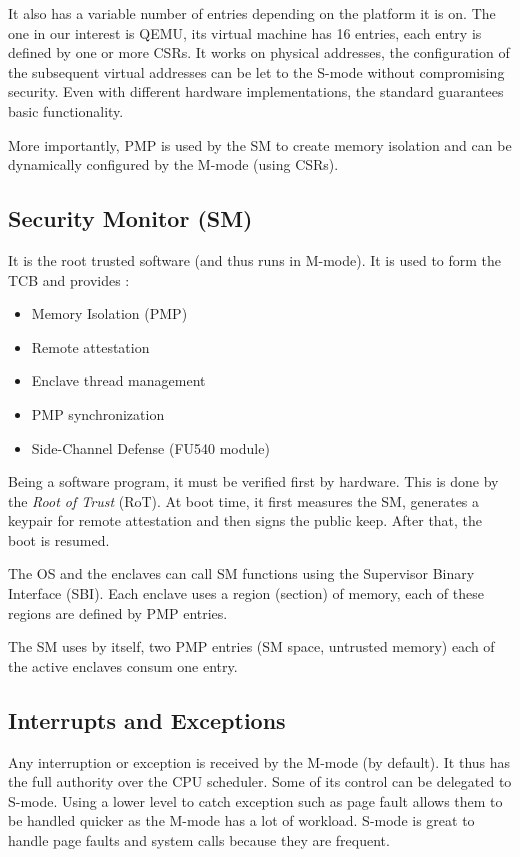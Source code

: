 \documentclass[11pt,a4paper]{report}
\begin{document}
It also has a variable number of entries depending on the platform it is on. 
The one in our interest is QEMU, its virtual machine has 16 entries, each entry is defined by one or more CSRs.
It works on physical addresses, the configuration of the subsequent virtual addresses can be let to the S-mode without compromising security.
Even with different hardware implementations, the standard guarantees basic functionality. 

More importantly, PMP is used by the SM to create memory isolation and can be dynamically configured by the M-mode (using CSRs).

\subsection{Security Monitor (SM)}
\label{sub:sm}
It is the root trusted software (and thus runs in M-mode). 
It is used to form the TCB and provides :
\begin{itemize}
    \item Memory Isolation (PMP)
    \item Remote attestation
    \item Enclave thread management
    \item PMP synchronization
    \item Side-Channel Defense (FU540 module)
\end{itemize}   
Being a software program, it must be verified first by hardware. 
This is done by the \textit{Root of Trust} (RoT). 
At boot time, it first measures the SM, generates a keypair for remote attestation and then signs the public keep.
After that, the boot is resumed.

The OS and the enclaves can call SM functions using the Supervisor Binary Interface (SBI).
Each enclave uses a region (section) of memory, each of these regions are defined by PMP entries.

The SM uses by itself, two PMP entries (SM space, untrusted memory) each of the active enclaves consum one entry.

\subsection{Interrupts and Exceptions}
Any interruption or exception is received by the M-mode (by default). 
It thus has the full authority over the CPU scheduler. 
Some of its control can be delegated to S-mode.
Using a lower level to catch exception such as page fault allows them to be handled quicker as the M-mode has a lot of workload.
S-mode is great to handle page faults and system calls because they are frequent.   
\end{document}
